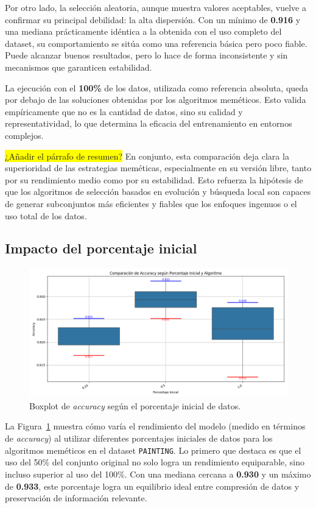 Por otro lado, la selección aleatoria, aunque muestra valores aceptables, vuelve a confirmar su principal debilidad: la alta dispersión.
Con un mínimo de \textbf{0.916} y una mediana prácticamente idéntica a la obtenida con el uso completo del dataset, 
su comportamiento se sitúa como una referencia básica pero poco fiable.
Puede alcanzar buenos resultados, pero lo hace de forma inconsistente y sin mecanismos que garanticen estabilidad.

La ejecución con el \textbf{100\%} de los datos, utilizada como referencia absoluta, queda por debajo de las soluciones obtenidas por los algoritmos meméticos.
Esto valida empíricamente que no es la cantidad de datos, sino su calidad y representatividad, lo que determina la eficacia del entrenamiento en entornos complejos.

\colorbox{yellow}{¿Añadir el párrafo de resumen?}
En conjunto, esta comparación deja clara la superioridad de las estrategias meméticas, especialmente en su versión libre,
tanto por su rendimiento medio como por su estabilidad.
Esto refuerza la hipótesis de que los algoritmos de selección basados en evolución y búsqueda local son capaces de generar
subconjuntos más eficientes y fiables que los enfoques ingenuos o el uso total de los datos.

\subsection{Impacto del porcentaje inicial}
\begin{figure}[h]
    \centering
    \includegraphics[width=1\textwidth]{imagenes/evaluaciones/painting/comparacion-por-porcentaje}
    \caption{Boxplot de \textit{accuracy} según el porcentaje inicial de datos.}
    \label{fig:accuracy_porcentaje_painting}
\end{figure}

La Figura~\ref{fig:accuracy_porcentaje_painting} muestra cómo varía el rendimiento del modelo (medido en términos de \textit{accuracy})
al utilizar diferentes porcentajes iniciales de datos para los algoritmos meméticos en el dataset \texttt{PAINTING}.
Lo primero que destaca es que el uso del 50\% del conjunto original no solo logra un rendimiento equiparable, sino incluso superior al uso del 100\%.
Con una mediana cercana a \textbf{0.930} y un máximo de \textbf{0.933}, este porcentaje logra un equilibrio ideal entre compresión de datos y preservación de información relevante.

